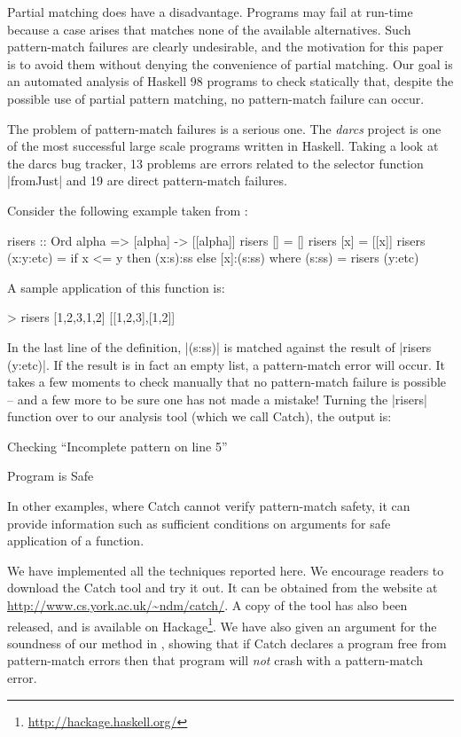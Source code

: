 \documentclass[preprint]{sigplanconf}
\begin{document}
Partial matching does have a disadvantage.  Programs may fail at run-time
because a case arises that matches none of the available alternatives.
Such pattern-match failures are clearly undesirable, and the motivation
for this paper is to avoid them without denying the convenience of
partial matching.  Our goal is an automated analysis of Haskell 98 programs
to check statically that, despite the possible use of partial pattern
matching, no pattern-match failure can occur.

The problem of pattern-match failures is a serious one. The \textit{darcs} project \cite{darcs} is one of the most successful large scale programs written in Haskell. Taking a look at the darcs bug tracker, 13 problems are errors related to the selector function |fromJust| and 19 are direct pattern-match failures.

Consider the following example taken from \citet{me:catch_tfp}:

\begin{code}
risers :: Ord alpha => [alpha] -> [[alpha]]
risers [] = []
risers [x] = [[x]]
risers (x:y:etc) = if x <= y then (x:s):ss else [x]:(s:ss)
    where (s:ss) = risers (y:etc)
\end{code}

\noindent A sample application of this function is:

\ignore\begin{code}
> risers [1,2,3,1,2]
[[1,2,3],[1,2]]
\end{code}

\noindent In the last line of the definition, |(s:ss)| is matched against the result of |risers (y:etc)|. If the result is in fact an empty list, a pattern-match error will occur. It takes a few moments to check manually that no pattern-match failure is possible -- and a few more to be sure one has not made a mistake! Turning the |risers| function over to our analysis tool (which we call Catch), the output is:

\smallskip
\par\noindent\textsf{Checking ``Incomplete pattern on line 5''}
\par\noindent\textsf{Program is Safe}
\smallskip

In other examples, where Catch cannot verify pattern-match safety, it can provide information such as sufficient conditions on arguments for safe application of a function.

We have implemented all the techniques reported here. We encourage readers to download the Catch tool and try it out. It can be obtained from the website at \url{http://www.cs.york.ac.uk/~ndm/catch/}. A copy of the tool has also been released, and is available on Hackage\footnote{\url{http://hackage.haskell.org/}}. We have also given an argument for the soundness of our method in \cite{me:thesis}, showing that if Catch declares a program free from pattern-match errors then that program will \textit{not} crash with a pattern-match error.
\end{document}
